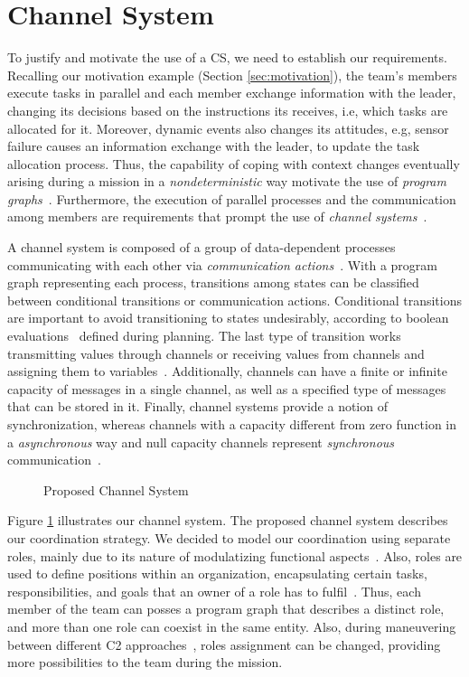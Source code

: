 \section{Channel System}
\label{sec:channelSystem}

To justify and motivate the use of a CS, we need to establish our requirements. Recalling our motivation example (Section \ref{sec:motivation}), the team's members execute tasks in parallel and each member exchange information with the leader, changing its decisions based on the instructions its receives, i.e, which tasks are allocated for it. Moreover, dynamic events also changes its attitudes, e.g, sensor failure causes an information exchange with the leader, to update the task allocation process. Thus, the capability of coping with context changes eventually arising during a mission in a \textit{nondeterministic} way motivate the use of \textit{program graphs}~\cite{modelcheckingBaier}. Furthermore, the execution of parallel processes and the communication among members are requirements that prompt the use of \textit{channel systems}~\cite{modelcheckingBaier}.

A channel system is composed of a group of data-dependent processes communicating with each other via \textit{communication actions}~\cite{modelcheckingBaier}. With a program graph representing each process, transitions among states can be classified between conditional transitions or communication actions. Conditional transitions are important to avoid transitioning to states undesirably, according to boolean evaluations~\cite{modelcheckingBaier} defined during planning. The last type of transition works transmitting values through channels or receiving values from channels and assigning them to variables~\cite{modelcheckingBaier}. Additionally, channels can have a finite or infinite capacity of messages in a single channel, as well as a specified type of messages that can be stored in it. Finally, channel systems provide a notion of synchronization, whereas channels with a capacity different from zero function in a \textit{asynchronous} way and null capacity channels represent \textit{synchronous} communication~\cite{modelcheckingBaier}.

\begin{figure}[!ht]
    \centering
    \scalebox{.75}{}
    \caption{Proposed Channel System}
    \label{fig:CS}
\end{figure}

Figure \ref{fig:CS} illustrates our channel system. The proposed channel system describes our coordination strategy. We decided to model our coordination using separate roles, mainly due to its nature of modulatizing functional aspects~\cite{roleOrientedModeling}. Also, roles are used to define positions within an organization, encapsulating certain tasks, responsibilities, and goals that an owner of a role has to fulfil~\cite{roleOrientedModeling}. Thus, each member of the team can posses a program graph that describes a distinct role, and more than one role can coexist in the same entity. Also, during maneuvering between different C2 approaches~\cite{france2014}, roles assignment can be changed, providing more possibilities to the team during the mission.

